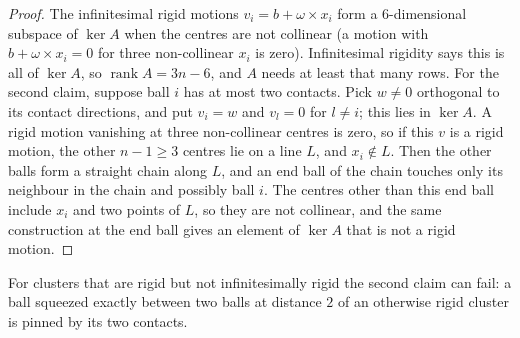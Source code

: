 \begin{proof}
The infinitesimal rigid motions $v_i=b+\omega\times x_i$ form a $6$-dimensional subspace of $\ker A$ when the
centres are not collinear (a motion with $b+\omega\times x_i=0$ for three non-collinear $x_i$ is zero).
Infinitesimal rigidity says this is all of $\ker A$, so $\operatorname{rank}A=3n-6$, and $A$ needs at least
that many rows. For the second claim, suppose ball $i$ has at most two contacts. Pick $w\ne0$ orthogonal
to its contact directions, and put $v_i=w$ and $v_l=0$ for $l\ne i$; this lies in $\ker A$. A rigid motion
vanishing at three non-collinear centres is zero, so if this $v$ is a rigid motion, the other $n-1\ge3$
centres lie on a line $L$, and $x_i\notin L$. Then the other balls form a straight chain along $L$, and an
end ball of the chain touches only its neighbour in the chain and possibly ball $i$. The centres other
than this end ball include $x_i$ and two points of $L$, so they are not collinear, and the same
construction at the end ball gives an element of $\ker A$ that is not a rigid motion.
\end{proof}

\noindent For clusters that are rigid but not infinitesimally rigid the second claim can fail: a ball
squeezed exactly between two balls at distance $2$ of an otherwise rigid cluster is pinned by its two
contacts.

